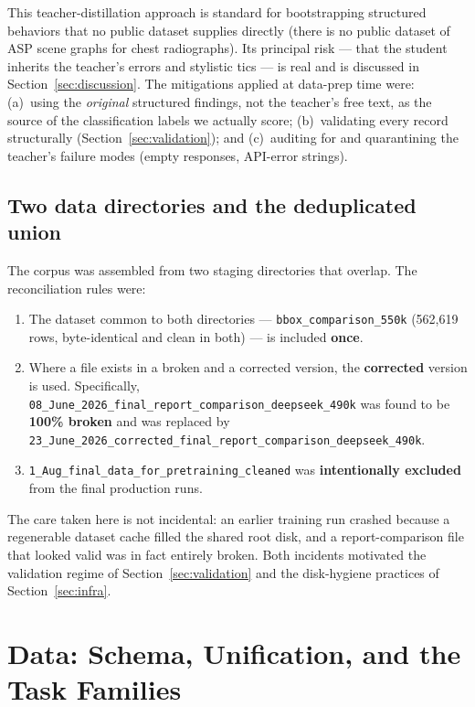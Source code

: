 \documentclass[11pt,a4paper]{article}
\begin{document}
This teacher-distillation approach is standard for bootstrapping structured behaviors that no public dataset supplies directly (there is no public dataset of ASP scene graphs for chest radiographs). Its principal risk --- that the student inherits the teacher's errors and stylistic tics --- is real and is discussed in Section~\ref{sec:discussion}. The mitigations applied at data-prep time were: (a)~using the \emph{original} structured findings, not the teacher's free text, as the source of the classification labels we actually score; (b)~validating every record structurally (Section~\ref{sec:validation}); and (c)~auditing for and quarantining the teacher's failure modes (empty responses, API-error strings).

\subsection{Two data directories and the deduplicated union}
The corpus was assembled from two staging directories that overlap. The reconciliation rules were:
\begin{enumerate}[leftmargin=1.6em]
  \item The dataset common to both directories --- \texttt{bbox\_comparison\_550k} (562{,}619 rows, byte-identical and clean in both) --- is included \textbf{once}.
  \item Where a file exists in a broken and a corrected version, the \textbf{corrected} version is used. Specifically, \texttt{08\_June\_2026\_final\_report\_comparison\_deepseek\_490k} was found to be \textbf{100\% broken} and was replaced by \texttt{23\_June\_2026\_corrected\_final\_report\_comparison\_deepseek\_490k}.
  \item \texttt{1\_Aug\_final\_data\_for\_pretraining\_cleaned} was \textbf{intentionally excluded} from the final production runs.
\end{enumerate}
The care taken here is not incidental: an earlier training run crashed because a regenerable dataset cache filled the shared root disk, and a report-comparison file that looked valid was in fact entirely broken. Both incidents motivated the validation regime of Section~\ref{sec:validation} and the disk-hygiene practices of Section~\ref{sec:infra}.

\section{Data: Schema, Unification, and the Task Families}
\label{sec:schema}
\end{document}
